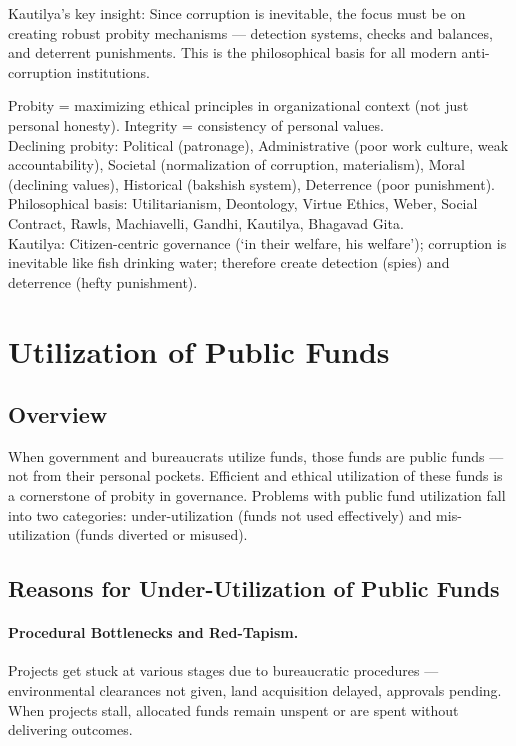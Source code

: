 \begin{KeyConcept}
Kautilya's key insight: Since corruption is inevitable, the focus must be on creating robust probity mechanisms --- detection systems, checks and balances, and deterrent punishments. This is the philosophical basis for all modern anti-corruption institutions.
\end{KeyConcept}

\begin{QuickRevision}
Probity = maximizing ethical principles in organizational context (not just personal honesty). Integrity = consistency of personal values.\\
Declining probity: Political (patronage), Administrative (poor work culture, weak accountability), Societal (normalization of corruption, materialism), Moral (declining values), Historical (bakshish system), Deterrence (poor punishment).\\
Philosophical basis: Utilitarianism, Deontology, Virtue Ethics, Weber, Social Contract, Rawls, Machiavelli, Gandhi, Kautilya, Bhagavad Gita.\\
Kautilya: Citizen-centric governance (`in their welfare, his welfare'); corruption is inevitable like fish drinking water; therefore create detection (spies) and deterrence (hefty punishment).
\end{QuickRevision}

\section{Utilization of Public Funds}

\subsection{Overview}
When government and bureaucrats utilize funds, those funds are public funds --- not from their personal pockets. Efficient and ethical utilization of these funds is a cornerstone of probity in governance. Problems with public fund utilization fall into two categories: under-utilization (funds not used effectively) and mis-utilization (funds diverted or misused).

\subsection{Reasons for Under-Utilization of Public Funds}

\paragraph{Procedural Bottlenecks and Red-Tapism.} Projects get stuck at various stages due to bureaucratic procedures --- environmental clearances not given, land acquisition delayed, approvals pending. When projects stall, allocated funds remain unspent or are spent without delivering outcomes.

